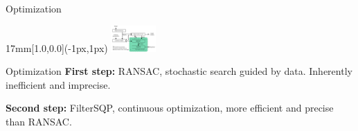 \begin{frame}{Optimization}
  \begin{textblock*}{17mm}[1.0,0.0](\paperwidth-1px,1px)
    \includegraphics[width=17mm]{blocos_s4.png}
  \end{textblock*}
\end{frame}
\addtocounter{framenumber}{-1}

\begin{frame}{Optimization}{}
  {\bf First step:} RANSAC, stochastic search guided by data. Inherently inefficient and imprecise.


  {\bf Second step:} FilterSQP, continuous optimization, more efficient and precise than RANSAC.
  

\end{frame}



